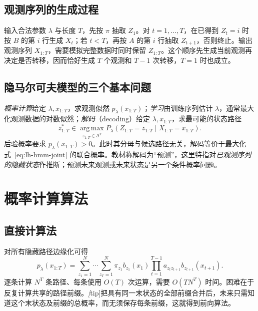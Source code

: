 \subsection{观测序列的生成过程}

输入合法参数 $\lambda$ 与长度 $T$，先按 $\pi$ 抽取 $Z_1$。对 $t=1,\ldots,T$，在已得到 $Z_t=i$ 时按 $B$ 的第 $i$ 行生成 $X_t$；若 $t<T$，再按 $A$ 的第 $i$ 行抽取 $Z_{t+1}$，否则终止。输出观测序列 $X_{1:T}$，需要模拟完整数据时同时保留 $Z_{1:T}$。这个顺序先生成当前观测再决定是否转移，因而恰好生成 $T$ 个观测和 $T-1$ 次转移，$T=1$ 时也成立。

\subsection{隐马尔可夫模型的三个基本问题}

\emph{概率计算}给定 $\lambda,x_{1:T}$，求观测似然 $p_\lambda(x_{1:T})$；\emph{学习}由训练序列估计 $\lambda$，通常最大化观测数据的对数似然；\emph{解码}（decoding）给定 $\lambda,x_{1:T}$，求最可能的状态路径
\begin{equation}
\label{eq:lh-hmm-decoding-objective}
 z_{1:T}^*\in\operatorname*{arg\,max}_{z_{1:T}\in\mathcal S^T}
 P_\lambda(Z_{1:T}=z_{1:T}\mid X_{1:T}=x_{1:T}).
\end{equation}
后验概率要求 $p_\lambda(x_{1:T})>0$。此时其分母与候选路径无关，解码等价于最大化式~\eqref{eq:lh-hmm-joint} 的联合概率。教材称解码为“预测”，这里特指对\emph{已观测序列的隐藏状态}作推断；预测未来观测或未来状态是另一个条件概率问题。

\section{概率计算算法}
\label{sec:lh-hmm-inference}

\subsection{直接计算法}

对所有隐藏路径边缘化可得
\begin{equation}
\label{eq:lh-hmm-likelihood}
 p_\lambda(x_{1:T})
 =\sum_{z_1=1}^N\cdots\sum_{z_T=1}^N
 \pi_{z_1}b_{z_1}(x_1)\prod_{t=1}^{T-1}a_{z_tz_{t+1}}b_{z_{t+1}}(x_{t+1}).
\end{equation}
逐条计算 $N^T$ 条路径、每条使用 $O(T)$ 次运算，需要 $O(TN^T)$ 时间。困难在于反复计算共享的路径前缀。\emph[tip]{把具有同一末状态的全部前缀合并}后，未来只需知道这个末状态及前缀的总概率，而无须保存每条前缀，这就得到前向算法。

